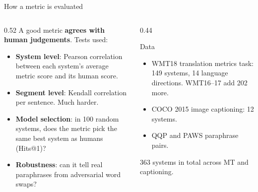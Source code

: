 \documentclass[aspectratio=169,11pt]{beamer}
\begin{document}
\begin{frame}{How a metric is evaluated}
  \begin{columns}[T]
    \begin{column}{0.52\textwidth}
      \small
      A good metric \textbf{agrees with human judgements}. Tests used:
      \begin{itemize}
        \item \textbf{System level}: Pearson correlation between each system's average metric score and its human score.
        \item \textbf{Segment level}: Kendall correlation per sentence. Much harder.
        \item \textbf{Model selection}: in 100 random systems, does the metric pick the same best system as humans (Hits@1)?
        \item \textbf{Robustness}: can it tell real paraphrases from adversarial word swaps?
      \end{itemize}
    \end{column}
    \begin{column}{0.44\textwidth}
      \begin{block}{Data}
        \small
        \begin{itemize}
          \item WMT18 translation metrics task: 149 systems, 14 language directions. WMT16--17 add 202 more.
          \item COCO 2015 image captioning: 12 systems.
          \item QQP and PAWS paraphrase pairs.
        \end{itemize}
        363 systems in total across MT and captioning.
      \end{block}
    \end{column}
  \end{columns}
\end{frame}
\end{document}
